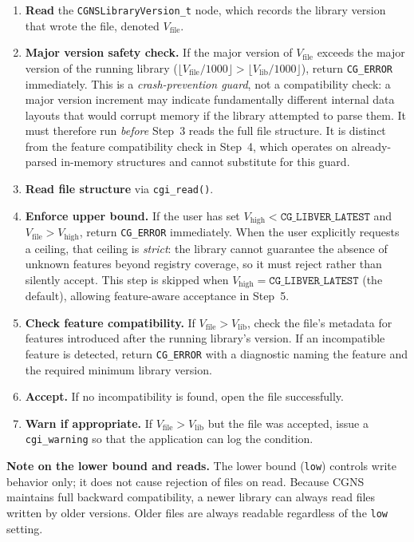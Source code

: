\documentclass[11pt,letterpaper]{article}
\begin{document}
\begin{enumerate}[leftmargin=2em]
\item \textbf{Read} the \texttt{CGNSLibraryVersion\_t} node, which
  records the library version that wrote the file, denoted
  $V_{\mathrm{file}}$.
\item \textbf{Major version safety check.}  If the major version of
  $V_{\mathrm{file}}$ exceeds the major version of the running library
  ($\lfloor V_{\mathrm{file}} / 1000 \rfloor >
   \lfloor V_{\mathrm{lib}} / 1000 \rfloor$),
  return \texttt{CG\_ERROR} immediately.  This is a
  \emph{crash-prevention guard}, not a compatibility check: a major
  version increment may indicate fundamentally different internal data
  layouts that would corrupt memory if the library attempted to parse
  them.  It must therefore run \emph{before} Step~3 reads the full
  file structure.  It is distinct from the feature compatibility check
  in Step~4, which operates on already-parsed in-memory structures and
  cannot substitute for this guard.
\item \textbf{Read file structure} via \texttt{cgi\_read()}.
\item \textbf{Enforce upper bound.}  If the user has set
  $V_{\mathrm{high}} < \texttt{CG\_LIBVER\_LATEST}$ and
  $V_{\mathrm{file}} > V_{\mathrm{high}}$, return
  \texttt{CG\_ERROR} immediately.  When the user explicitly requests
  a ceiling, that ceiling is \emph{strict}: the library cannot
  guarantee the absence of unknown features beyond registry coverage,
  so it must reject rather than silently accept.  This step is
  skipped when $V_{\mathrm{high}} = \texttt{CG\_LIBVER\_LATEST}$
  (the default), allowing feature-aware acceptance in Step~5.
\item \textbf{Check feature compatibility.}  If
  $V_{\mathrm{file}} > V_{\mathrm{lib}}$, check the file's
  metadata for features introduced after the running library's
  version.  If an incompatible feature is detected, return
  \texttt{CG\_ERROR} with a diagnostic naming the feature and the
  required minimum library version.
\item \textbf{Accept.}  If no incompatibility is found, open the file
  successfully.
\item \textbf{Warn if appropriate.}  If $V_{\mathrm{file}} >
  V_{\mathrm{lib}}$ but the file was accepted, issue a
  \texttt{cgi\_warning} so that the application can log the condition.
\end{enumerate}

\textbf{Note on the lower bound and reads.}  The lower bound
(\texttt{low}) controls write behavior only; it does not cause
rejection of files on read.  Because CGNS maintains full backward
compatibility, a newer library can always read files written by older
versions.  Older files are always readable regardless of the
\texttt{low} setting.
\end{document}
